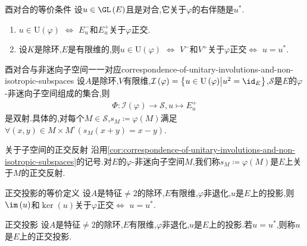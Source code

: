 \begin{proposition}{酉对合的等价条件}{}
	设$u\in\GL\left(E\right)$且是对合,它关于$\varphi$的右伴随是$u^{\ast}$.
	\begin{enumerate}
		\item $u\in\mathrm{U}\left(\varphi\right)$ $\iff$ $E_{u}^{-}$和$E_{u}^{+}$关于$\varphi$正交.
		\item 设$K$是除环,$E$是有限维的,则$u\in\mathrm{U}\left(\varphi\right)$ $\iff$ $V^{-}$和$V^{+}$关于$\varphi$正交$\iff$ $u=u^{\ast}$.
	\end{enumerate}
\end{proposition}

\begin{corollary}{酉对合与非迷向子空间一一对应}{correspondence-of-unitary-involutions-and-non-isotropic-subspaces}
	设$A$是除环,$V$有限维,$\mathcal{I}\left(\varphi\right)=\left\{u\in\mathrm{U}\left(\varphi\right)\middle|u^{2}=\id_{E}\right\}$,$\mathcal{S}$是$E$的$\varphi$-非迷向子空间组成的集合,则
	\begin{align*}
		\Phi:\mathcal{I}\left(\varphi\right)\to\mathcal{S},u\mapsto E_{u}^{+}
	\end{align*}
	是双射.具体的,对每个$M\in\mathcal{S}$,$s_{M}\coloneq\varphi\left(M\right)$满足$\forall\left(x,y\right)\in M\times M^{\circ}\left(s_{M}\left(x+y\right)=x-y\right)$.
\end{corollary}

\begin{definition}{关于子空间的正交反射}{}
	沿用\cref{cor:correspondence-of-unitary-involutions-and-non-isotropic-subspaces}的记号.对$E$的$\varphi$-非迷向子空间$M$,我们称$s_{M}\coloneq\varphi\left(M\right)$是$E$上关于$M$的正交反射.
\end{definition}

\begin{corollary}{正交投影的等价定义}{}
	设$A$是特征$\neq 2$的除环,$E$有限维,$\varphi$非退化,$u$是$E$上的投影,则$\im\left(u\right)$和$\ker\left(u\right)$关于$\varphi$正交$\iff$ $u=u^{\ast}$.
\end{corollary}

\begin{definition}{正交投影}{}
	设$A$是特征$\neq 2$的除环,$E$有限维,$\varphi$非退化,$u$是$E$上的投影.若$u=u^{\ast}$,则称$u$是$E$上的正交投影.
\end{definition}